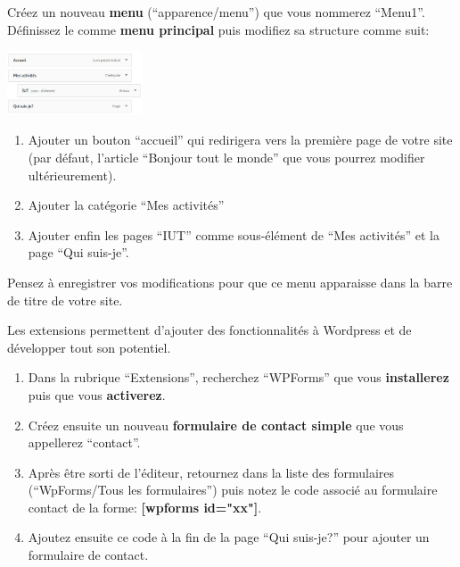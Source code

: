 \documentclass[a4paper, 8pt]{article}
\begin{document}
\clearpage
\exost Cr\'eez un nouveau \textbf{menu} (``apparence/menu'') que vous nommerez ``Menu1''. D\'efinissez le comme \textbf{menu principal} puis modifiez sa structure comme suit:
\begin{center}
\includegraphics[width=0.3\textwidth]{menu1.jpg} 
\end{center}
\begin{enumerate}
 \item Ajouter un bouton ``accueil'' qui redirigera vers la premi\`ere page de votre site (par d\'efaut, l'article ``Bonjour tout le monde'' que vous pourrez modifier ult\'erieurement).
 \item Ajouter la cat\'egorie ``Mes activit\'es''
 \item Ajouter enfin les pages ``IUT'' comme sous-\'el\'ement de ``Mes activit\'es'' et la page ``Qui suis-je''.
\end{enumerate}
Pensez \`a enregistrer vos modifications pour que ce menu apparaisse dans la barre de titre de votre site. 


\exost Les extensions permettent d'ajouter des fonctionnalit\'es \`a Wordpress et de d\'evelopper tout son potentiel.
\begin{enumerate}
 \item Dans la rubrique ``Extensions'', recherchez ``WPForms'' que vous \textbf{installerez} puis que vous \textbf{activerez}.
 \item Cr\'eez ensuite un nouveau \textbf{formulaire de contact simple} que vous appellerez ``contact''.
 \item Apr\`es \^etre sorti de l'\'editeur, retournez dans la liste des formulaires (``WpForms/Tous les formulaires'') puis notez le code associ\'e au formulaire contact de la forme: \textbf{[wpforms id="xx"]}.
 \item Ajoutez ensuite ce code \`a la fin de la page ``Qui suis-je?'' pour ajouter un formulaire de contact.
\end{enumerate}




% 
% 
% 
% 
% 
% 
% 
% 
% 
\end{document}
